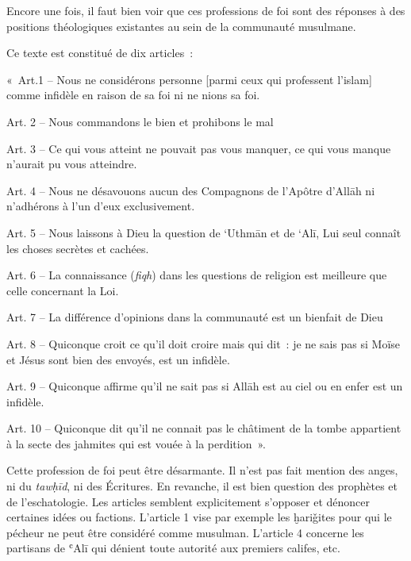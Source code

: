Encore une fois, il faut bien voir que ces professions de foi sont des
réponses à des positions théologiques existantes au sein de la
communauté musulmane.


Ce texte est constitué de dix articles~:

«~Art.1 -- Nous ne considérons personne {[}parmi ceux qui professent
l'islam{]} comme infidèle en raison de sa foi ni ne nions sa foi.

Art. 2 -- Nous commandons le bien et prohibons le mal

Art. 3 -- Ce qui vous atteint ne pouvait pas vous manquer, ce qui vous
manque n'aurait pu vous atteindre.

Art. 4 -- Nous ne désavouons aucun des Compagnons de l'Apôtre d'Allāh ni
n'adhérons à l'un d'eux exclusivement.

Art. 5 -- Nous laissons à Dieu la question de `Uthmān et de `Alī, Lui
seul connaît les choses secrètes et cachées.

Art. 6 -- La connaissance (\emph{fiqh}) dans les questions de religion
est meilleure que celle concernant la Loi.

Art. 7 -- La différence d'opinions dans la communauté est un bienfait de
Dieu

Art. 8 -- Quiconque croit ce qu'il doit croire mais qui dit~: je ne sais
pas si Moïse et Jésus sont bien des envoyés, est un infidèle.

Art. 9 -- Quiconque affirme qu'il ne sait pas si Allāh est au ciel ou en
enfer est un infidèle.

Art. 10 -- Quiconque dit qu'il ne connait pas le châtiment de la tombe
appartient à la secte des jahmites qui est vouée à la perdition~».

Cette profession de foi peut être désarmante. Il n'est pas fait mention
des anges, ni du \emph{tawḥīd}, ni des Écritures. En revanche, il est
bien question des prophètes et de l'eschatologie. Les articles semblent
explicitement s'opposer et dénoncer certaines idées ou factions.
L'article 1 vise par exemple les ḫariǧites pour qui le pécheur ne peut
être considéré comme musulman. L'article 4 concerne les partisans de
ʿAlī qui dénient toute autorité aux premiers califes, etc.

